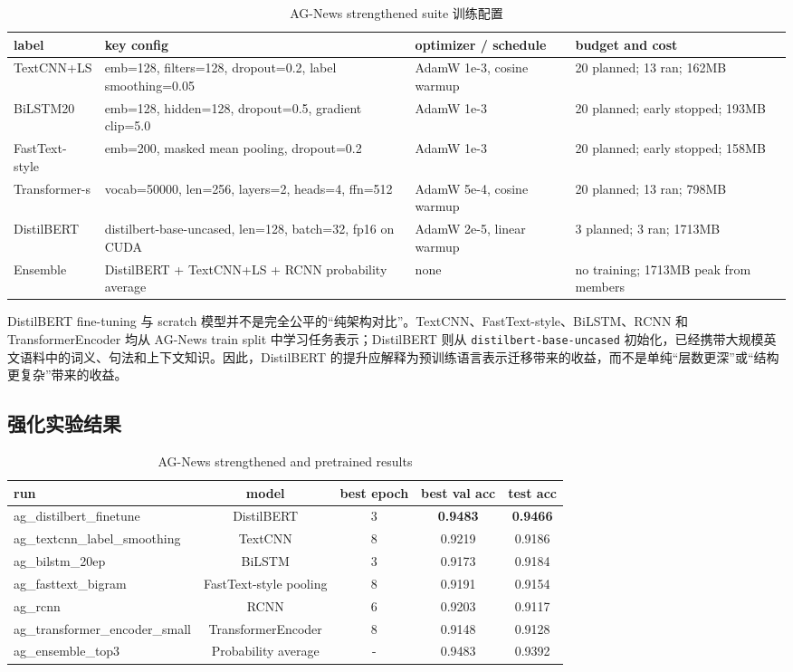 \documentclass[UTF8,a4paper,11pt]{ctexart}
\begin{document}
\begin{table}[H]
\centering
\caption{AG-News strengthened suite 训练配置}
\scriptsize
\begin{tabular}{p{2.4cm}p{5.2cm}p{4.0cm}p{3.2cm}}
\toprule
label & key config & optimizer / schedule & budget and cost \\
\midrule
TextCNN+LS & emb=128, filters=128, dropout=0.2, label smoothing=0.05 & AdamW 1e-3, cosine warmup & 20 planned; 13 ran; 162MB \\
BiLSTM20 & emb=128, hidden=128, dropout=0.5, gradient clip=5.0 & AdamW 1e-3 & 20 planned; early stopped; 193MB \\
FastText-style & emb=200, masked mean pooling, dropout=0.2 & AdamW 1e-3 & 20 planned; early stopped; 158MB \\
Transformer-s & vocab=50000, len=256, layers=2, heads=4, ffn=512 & AdamW 5e-4, cosine warmup & 20 planned; 13 ran; 798MB \\
DistilBERT & distilbert-base-uncased, len=128, batch=32, fp16 on CUDA & AdamW 2e-5, linear warmup & 3 planned; 3 ran; 1713MB \\
Ensemble & DistilBERT + TextCNN+LS + RCNN probability average & none & no training; 1713MB peak from members \\
\bottomrule
\end{tabular}
\end{table}

DistilBERT fine-tuning 与 scratch 模型并不是完全公平的“纯架构对比”。TextCNN、FastText-style、BiLSTM、RCNN 和 TransformerEncoder 均从 AG-News train split 中学习任务表示；DistilBERT 则从 \texttt{distilbert-base-uncased} 初始化，已经携带大规模英文语料中的词义、句法和上下文知识。因此，DistilBERT 的提升应解释为预训练语言表示迁移带来的收益，而不是单纯“层数更深”或“结构更复杂”带来的收益。

\subsection{强化实验结果}
\begin{table}[H]
\centering
\caption{AG-News strengthened and pretrained results}
\begin{tabular}{lcccc}
\toprule
run & model & best epoch & best val acc & test acc \\
\midrule
ag\_distilbert\_finetune & DistilBERT & 3 & \textbf{0.9483} & \textbf{0.9466} \\
ag\_textcnn\_label\_smoothing & TextCNN & 8 & 0.9219 & 0.9186 \\
ag\_bilstm\_20ep & BiLSTM & 3 & 0.9173 & 0.9184 \\
ag\_fasttext\_bigram & FastText-style pooling & 8 & 0.9191 & 0.9154 \\
ag\_rcnn & RCNN & 6 & 0.9203 & 0.9117 \\
ag\_transformer\_encoder\_small & TransformerEncoder & 8 & 0.9148 & 0.9128 \\
ag\_ensemble\_top3 & Probability average & - & 0.9483 & 0.9392 \\
\bottomrule
\end{tabular}
\end{table}
\end{document}
